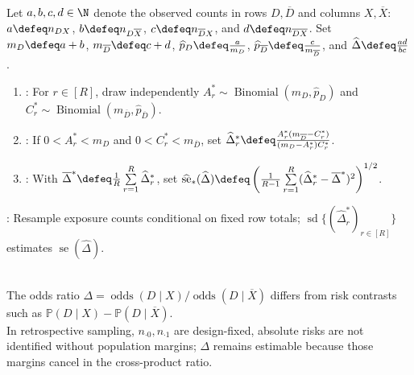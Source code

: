 \begin{method} \label{meth:parametric-bootstrap-odds-ratio-standard-error} \\
Let $a,b,c,d\in\N$ denote the observed counts in rows $D,\overline{D}$ and columns $X,\overline{X}$: $a\defeq n_{DX}$, $b\defeq n_{D\overline{X}}$, $c\defeq n_{\overline{D}X}$, and $d\defeq n_{\overline{D}\overline{X}}$. Set $m_D\defeq a+b$, $m_{\overline{D}}\defeq c+d$, $\widehat{p}_D\defeq\frac{a}{m_D}$, $\widehat{p}_{\overline{D}}\defeq\frac{c}{m_{\overline{D}}}$, and $\widehat{\Delta}\defeq\frac{ad}{bc}$.
\begin{enumerate}[label=(\roman*)]
\setlength{\itemsep}{0pt}
\item {}: For $r\in[R]$, draw independently $A_r^{\ast}\sim\operatorname{Binomial}(m_D,\widehat{p}_D)$ and $C_r^{\ast}\sim\operatorname{Binomial}(m_{\overline{D}},\widehat{p}_{\overline{D}})$.
\item {}: If $0<A_r^{\ast}<m_D$ and $0<C_r^{\ast}<m_{\overline{D}}$, set $\widehat{\Delta}_r^{\ast}\defeq\frac{A_r^{\ast}(m_{\overline{D}}-C_r^{\ast})}{(m_D-A_r^{\ast})C_r^{\ast}}$.
\item {}: With $\overline{\Delta}^{\ast}\defeq\frac{1}{R}\sum\limits_{r=1}^{R}\widehat{\Delta}_r^{\ast}$, set $\widehat{\operatorname{se}}_{\ast}(\widehat{\Delta})\defeq\left(\frac{1}{R-1}\sum\limits_{r=1}^{R}(\widehat{\Delta}_r^{\ast}-\overline{\Delta}^{\ast})^2\right)^{1/2}$.
\end{enumerate}
: Resample exposure counts conditional on fixed row totals; $\operatorname{sd}\{(\widehat{\Delta}_r^{\ast})_{r\in[R]}\}$ estimates $\operatorname{se}(\widehat{\Delta})$.
\end{method}

\begin{remark} \label{rem:odds-ratio-risk-and-retrospective-caution} \\
The odds ratio $\Delta=\operatorname{odds}(D\mid X)/\operatorname{odds}(D\mid\overline{X})$ differs from risk contrasts such as $\mathbb{P}(D\mid X)-\mathbb{P}(D\mid\overline{X})$.\\
In retrospective sampling, $n_{\cdot0},n_{\cdot1}$ are design-fixed, absolute risks are not identified without population margins; $\Delta$ remains estimable because those margins cancel in the cross-product ratio.
\end{remark}
